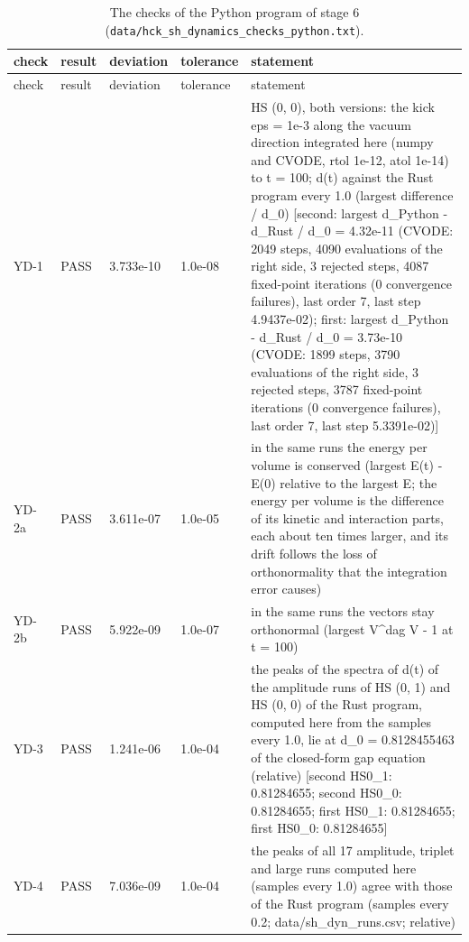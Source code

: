 \documentclass[aps,prd,onecolumn,superscriptaddress,nofootinbib,floatfix,longbibliography]{revtex4-2}
\begin{document}
\begingroup\fontsize{7}{8.5}\selectfont\setlength{\tabcolsep}{3pt}
\begin{longtable}{p{}p{}p{}p{}p{}}
\caption{\label{tab:checks_dynamics_python}The checks of the Python program of stage 6 (\texttt{data/hck\_sh\_dynamics\_checks\_python.txt}).}\\
\hline\hline
check & result & deviation & tolerance & statement \\ \hline
\endfirsthead
\hline check & result & deviation & tolerance & statement \\ \hline
\endhead
\hline\hline
\endlastfoot
YD-1 & PASS & 3.733e-10 & 1.0e-08 & HS (0, 0), both versions: the kick eps = 1e-3 along the vacuum direction integrated here (numpy and CVODE, rtol 1e-12, atol 1e-14) to t = 100; d(t) against the Rust program every 1.0 (largest \textbar{}difference\textbar{} / d\_0) [second: largest \textbar{}d\_Python - d\_Rust\textbar{} / d\_0 = 4.32e-11 (CVODE: 2049 steps, 4090 evaluations of the right side, 3 rejected steps, 4087 fixed-point iterations (0 convergence failures), last order 7, last step 4.9437e-02); first: largest \textbar{}d\_Python - d\_Rust\textbar{} / d\_0 = 3.73e-10 (CVODE: 1899 steps, 3790 evaluations of the right side, 3 rejected steps, 3787 fixed-point iterations (0 convergence failures), last order 7, last step 5.3391e-02)] \\
YD-2a & PASS & 3.611e-07 & 1.0e-05 & in the same runs the energy per volume is conserved (largest \textbar{}E(t) - E(0)\textbar{} relative to the largest \textbar{}E\textbar{}; the energy per volume is the difference of its kinetic and interaction parts, each about ten times larger, and its drift follows the loss of orthonormality that the integration error causes) \\
YD-2b & PASS & 5.922e-09 & 1.0e-07 & in the same runs the vectors stay orthonormal (largest \textbar{}V\textasciicircum{}dag V - 1\textbar{} at t = 100) \\
YD-3 & PASS & 1.241e-06 & 1.0e-04 & the peaks of the spectra of \textbar{}d(t)\textbar{} of the amplitude runs of HS (0, 1) and HS (0, 0) of the Rust program, computed here from the samples every 1.0, lie at d\_0 = 0.8128455463 of the closed-form gap equation (relative) [second HS0\_1: 0.81284655; second HS0\_0: 0.81284655; first HS0\_1: 0.81284655; first HS0\_0: 0.81284655] \\
YD-4 & PASS & 7.036e-09 & 1.0e-04 & the peaks of all 17 amplitude, triplet and large runs computed here (samples every 1.0) agree with those of the Rust program (samples every 0.2; data/sh\_dyn\_runs.csv; relative) \\

\end{longtable}
\end{document}
